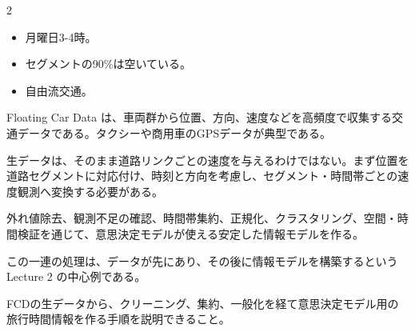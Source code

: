 \begin{multicols}{2}

\footnotesize

\raggedcolumns


\begin{itemize}
\item 月曜日3-4時。
\item セグメントの90\%は空いている。
\item 自由流交通。
\end{itemize}

Floating Car Data は、車両群から位置、方向、速度などを高頻度で収集する交通データである。タクシーや商用車のGPSデータが典型である。\par

生データは、そのまま道路リンクごとの速度を与えるわけではない。まず位置を道路セグメントに対応付け、時刻と方向を考慮し、セグメント・時間帯ごとの速度観測へ変換する必要がある。\par

外れ値除去、観測不足の確認、時間帯集約、正規化、クラスタリング、空間・時間検証を通じて、意思決定モデルが使える安定した情報モデルを作る。\par

この一連の処理は、データが先にあり、その後に情報モデルを構築するという Lecture 2 の中心例である。\par

FCDの生データから、クリーニング、集約、一般化を経て意思決定モデル用の旅行時間情報を作る手順を説明できること。\par



\end{multicols}
